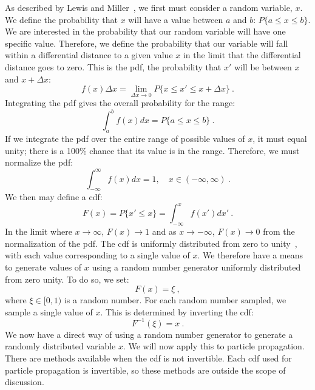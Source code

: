 As described by Lewis and Miller~\cite{lewis1993}, we first must
consider a random variable, $x$. We define the probability that $x$
will have a value between $a$ and $b$: $P\{a \leq x \leq b\}$. We
are interested in the probability that our random variable will have one
specific value. Therefore, we define the probability that our variable
will fall within a differential distance to a given value $x$ in the
limit that the differential distance goes to zero. This is the
\gls{pdf}, the probability that $x'$ will be between $x$ and $x +
\Delta x$:
\begin{equation}
  \label{eq:pdf_initial}
 f(x)\Delta x = \lim_{\Delta x \to 0}  P \{ x \leq x' \leq x + \Delta x \}\:.
\end{equation}
Integrating the \gls{pdf} gives the overall probability for the range:
\begin{equation}
\label{pdf}
  \int_a^bf(x)dx = P\{a \leq x \leq b\}\:.
\end{equation}
If we integrate the \gls{pdf} over the entire range of possible values
of $x$, it must equal unity; there is a 100\% chance that its value is
in the range. Therefore, we must normalize the \gls{pdf}:
\begin{equation*}
  \int_{-\infty}^{\infty}f(x)dx = 1, \quad x \in (-\infty,\infty)\:.
\end{equation*}
We then may define a \gls{cdf}:
\begin{equation}
  \label{eq:cdf}
  F(x) = P \{ x' \leq x\} = \int_{-\infty}^xf(x')dx'\:.
\end{equation}
In the limit where $x \to \infty$, $F(x) \to 1$ and as
$x \to -\infty$, $F(x) \to 0$ from the normalization of the
\gls{pdf}. The \gls{cdf} is uniformly distributed from zero to
unity~\cite{lewis1993}, with each value corresponding to a single
value of $x$. We therefore have a means to generate values of $x$
using a random number generator uniformly distributed from zero
unity. To do so, we set:
\begin{equation*}
  F(x) = \xi\:,
\end{equation*}
where $\xi \in [0,1)$ is a random number. For each random number
sampled, we sample a single value of $x$. This is determined by
inverting the \gls{cdf}:
\begin{equation}
  \label{eq:inverted_cdf}
  F^{-1}(\xi) = x\:.
\end{equation}
We now have a direct way of using a random number generator to
generate a randomly distributed variable $x$. We will now apply this
to particle propagation. There are methods available when the
\gls{cdf} is not invertible. Each \gls{cdf} used for particle
propagation is invertible, so these methods are outside the scope of
discussion.

